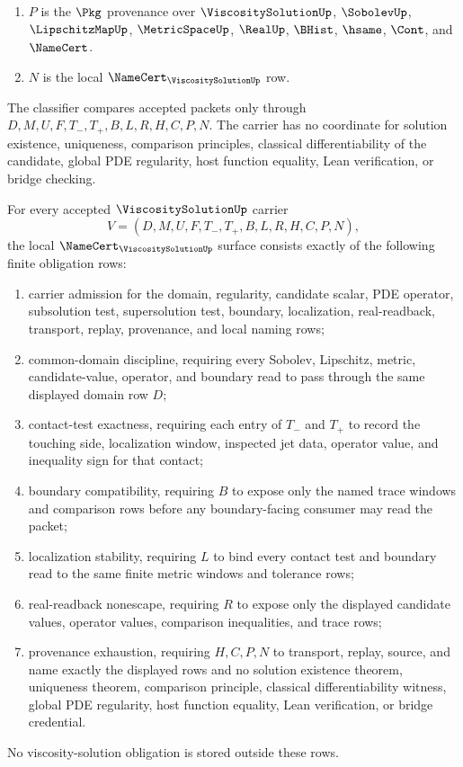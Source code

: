 \begin{definition}
\begin{enumerate}
$$
D,M,U,F,T_{-},T_{+},B,L,R \longmapsto H,P,N .
$$
\item $P$ is the $\Pkg$ provenance over $\ViscositySolutionUp$, $\SobolevUp$, $\LipschitzMapUp$, $\MetricSpaceUp$, $\RealUp$, $\BHist$, $\hsame$, $\Cont$, and $\NameCert$.
\item $N$ is the local $\NameCert_{\ViscositySolutionUp}$ row.
\end{enumerate}
The classifier compares accepted packets only through $D,M,U,F,T_{-},T_{+},B,L,R,H,C,P,N$. The carrier has no coordinate for solution existence, uniqueness, comparison principles, classical differentiability of the candidate, global PDE regularity, host function equality, Lean verification, or bridge checking.
\end{definition}

\begin{theorem}
\label{thm:viscosity-solution-namecert-obligations}
For every accepted $\ViscositySolutionUp$ carrier
$$
V=(D,M,U,F,T_{-},T_{+},B,L,R,H,C,P,N),
$$
the local $\NameCert_{\ViscositySolutionUp}$ surface consists exactly of the following finite obligation rows:
\begin{enumerate}
\item carrier admission for the domain, regularity, candidate scalar, PDE operator, subsolution test, supersolution test, boundary, localization, real-readback, transport, replay, provenance, and local naming rows;
\item common-domain discipline, requiring every Sobolev, Lipschitz, metric, candidate-value, operator, and boundary read to pass through the same displayed domain row $D$;
\item contact-test exactness, requiring each entry of $T_{-}$ and $T_{+}$ to record the touching side, localization window, inspected jet data, operator value, and inequality sign for that contact;
\item boundary compatibility, requiring $B$ to expose only the named trace windows and comparison rows before any boundary-facing consumer may read the packet;
\item localization stability, requiring $L$ to bind every contact test and boundary read to the same finite metric windows and tolerance rows;
\item real-readback nonescape, requiring $R$ to expose only the displayed candidate values, operator values, comparison inequalities, and trace rows;
\item provenance exhaustion, requiring $H,C,P,N$ to transport, replay, source, and name exactly the displayed rows and no solution existence theorem, uniqueness theorem, comparison principle, classical differentiability witness, global PDE regularity, host function equality, Lean verification, or bridge credential.
\end{enumerate}
No viscosity-solution obligation is stored outside these rows.
\end{theorem}

